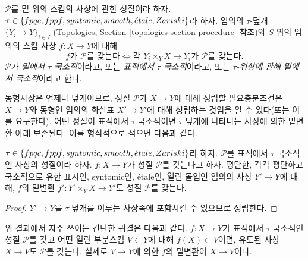 \begin{definition}
\label{definition-property-morphisms-local}
\leavevmode\par\noindent
$\mathcal{P}$를 밑 위의 스킴의 사상에 관한 성질이라 하자.
$\tau \in \{fpqc, fppf, syntomic, smooth, {\acute{e}tale}, Zariski\}$라 하자.
임의의 $\tau$-덮개 $\{Y_i \to Y\}_{i \in I}$ (Topologies, Section
\ref{topologies-section-procedure} 참조)와 $S$ 위의 임의의 스킴 사상
$f : X \to Y$에 대해
$$
f \text{가 }\mathcal{P}\text{를 갖는다}
\Leftrightarrow
\text{각 }Y_i \times_Y X \to Y_i\text{가 }\mathcal{P}\text{를 갖는다}.
$$
$\mathcal{P}$가 {\it 밑에서 $\tau$ 국소적}이라고, 또는
{\it 표적에서 $\tau$ 국소적}이라고, 또는
{\it $\tau$-위상에 관해 밑에서 국소적}이라고 한다.
\end{definition}

\noindent
동형사상은 언제나 덮개이므로, 성질 $\mathcal{P}$가 $X \to Y$에 대해
성립할 필요충분조건은 $X \to Y$와 동형인 임의의 화살표 $X' \to Y'$에
대해 성립하는 것임을 알 수 있다(또는 이를 요구한다). 어떤 성질이
표적에서 $\tau$-국소적이면 $\tau$-덮개에 나타나는 사상에 의한 밑변환
아래 보존된다. 이를 형식적으로 적으면 다음과 같다.

\begin{lemma}
\label{lemma-pullback-property-local-target}
$\tau \in \{fpqc, fppf, syntomic, smooth, {\acute{e}tale}, Zariski\}$라 하자.
$\mathcal{P}$를 표적에서 $\tau$ 국소적인 사상의 성질이라 하자.
$f : X \to Y$가 성질 $\mathcal{P}$를 갖는다고 하자. 평탄한, 각각 평탄하고
국소적으로 유한 표시인, syntomic인, \'etale인, 열린 몰입인 임의의 사상
$Y' \to Y$에 대해, $f$의 밑변환 $f' : Y' \times_Y X \to Y'$도 성질
$\mathcal{P}$를 갖는다.
\end{lemma}

\begin{proof}
$Y' \to Y$를 $\tau$-덮개를 이루는 사상족에 포함시킬 수 있으므로
성립한다.
\end{proof}

\noindent
위 결과에서 자주 쓰이는 간단한 귀결은 다음과 같다. $f : X \to Y$가
표적에서 $\tau$-국소적인 성질 $\mathcal{P}$를 갖고 어떤 열린 부분스킴
$V \subset Y$에 대해 $f(X) \subset V$이면, 유도된 사상 $X \to V$도
$\mathcal{P}$를 갖는다. 실제로 $V \to Y$에 의한 $f$의 밑변환이
$X \to V$이다.

